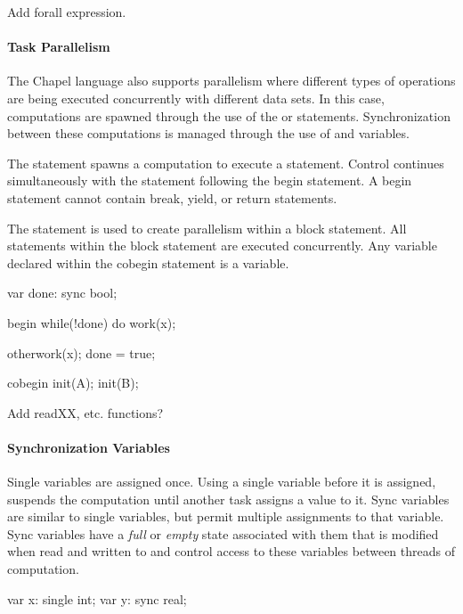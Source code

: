 \begin{TODO}
Add forall expression.
\end{TODO}

\paragraph{Task Parallelism}
The Chapel language also supports parallelism where different types of
operations are being executed concurrently with different data sets.
In this case, computations are spawned through the use of the 
or  statements.  Synchronization between these computations
is managed through the use of  and
 variables.

The  statement spawns a computation to execute a
statement. Control continues simultaneously with the statement following
the begin statement.  A begin statement cannot contain break,
yield, or return statements.  

The  statement is used to create parallelism within
a block statement.  All statements within the block statement
are executed concurrently.  Any variable declared within the cobegin
statement is a  variable.

\begin{example}
\begin{chapel}
var done: sync bool;
 
begin 
  while(!done) do work(x);

otherwork(x);
done = true;

cobegin {
  init(A);
  init(B);
}
\end{chapel}
\end{example}

\begin{TODO}
Add readXX, etc. functions?
\end{TODO}

\paragraph{Synchronization Variables}
Single variables are assigned once.  Using a single variable
before it is assigned, suspends the computation until another
task assigns a value to it.
Sync variables are similar to single variables,
but permit multiple assignments to that variable. Sync
variables have a {\em full} or {\em empty} state associated
with them that is modified when read and written to and control
access to these variables between threads of computation.
\begin{chapel}
var x: single int;
var y: sync real;
\end{chapel}

